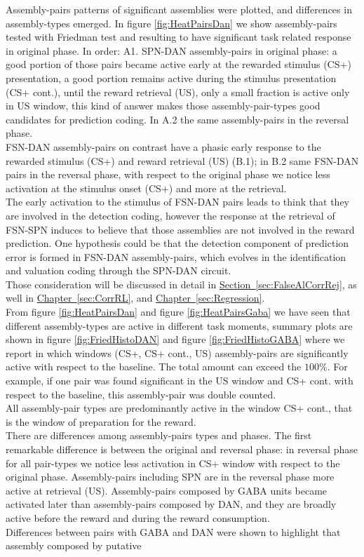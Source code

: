 Assembly-pairs patterns of significant assemblies were plotted, and differences in assembly-types emerged. In figure \ref{fig:HeatPairsDan} we show assembly-pairs tested with Friedman test and resulting to have significant task related response in original phase. In order: A1. SPN-DAN assembly-pairs in original phase: a good portion of those pairs became active early at the rewarded stimulus (CS+) presentation, a good portion remains active during the stimulus presentation (CS+ cont.), until the reward retrieval (US), only a small fraction is active only in US window, this kind of answer makes those assembly-pair-types good candidates for prediction coding. In A.2 the same assembly-pairs in the reversal phase.\\FSN-DAN assembly-pairs on contrast have a phasic early response to the rewarded stimulus (CS+) and reward retrieval (US) (B.1); in B.2 same FSN-DAN pairs in the reversal phase, with respect to the original phase we notice less activation at the stimulus onset (CS+) and more at the retrieval.\\The early activation to the stimulus of FSN-DAN pairs leads to think that they are involved in the detection coding, however the response at the retrieval of FSN-SPN induces to believe that those assemblies are not involved in the reward prediction. One hypothesis could be that the detection component of prediction error is formed in FSN-DAN assembly-pairs, which evolves in the identification and valuation coding through the SPN-DAN circuit.\\Those consideration will be discussed in detail in \hyperref[sec:FalseAlCorrRej]{Section~\ref*{sec:FalseAlCorrRej}}, as well in \hyperref[sec:CorrRL]{Chapter~\ref*{sec:CorrRL}}, and \hyperref[sec:Regression]{Chapter~\ref*{sec:Regression}}.\\From figure \ref{fig:HeatPairsDan} and figure \ref{fig:HeatPairsGaba} we have seen that different assembly-types are active in different task moments, summary plots are shown in figure  \ref{fig:FriedHistoDAN} and figure \ref{fig:FriedHistoGABA} where we report in which windows (CS+, CS+ cont., US) assembly-pairs are significantly active with respect to the baseline. The total amount can exceed the $100\%$. For example, if one pair was found significant in the US window and CS+ cont. with respect to the baseline, this assembly-pair was double counted.\\All assembly-pair types are predominantly active in the window CS+ cont., that is the window of preparation for the reward.\\There are  differences among assembly-pairs types and phases. The first remarkable difference is between the original and reversal phase: in reversal phase for all pair-types we notice less activation in CS+ window with respect to the original phase. Assembly-pairs including SPN are in the reversal phase more active at retrieval (US). Assembly-pairs composed by GABA units became activated later than assembly-pairs composed by DAN, and they are broadly active before the reward and during the reward consumption.\\Differences between pairs with GABA and DAN were shown to highlight that assembly composed by putative 